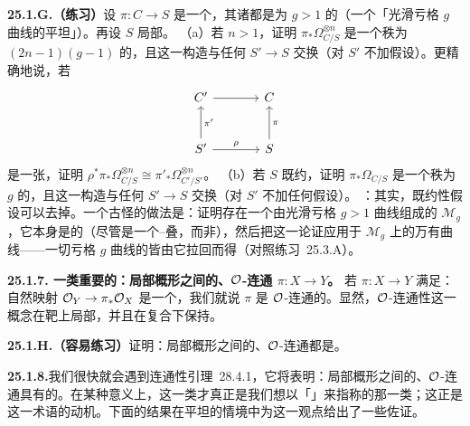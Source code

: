 \textbf{25.1.G.（练习）}\quad 设 $\pi\colon C\to S$ 是一个\trProper\trSmooth\trMorphism，其诸\trFiber{}都是\trGenus{}为 $g>1$ 的\trCurve（一个「光滑亏格 $g$ 曲线的平坦\trFamily」）。再设 $S$ 局部\trNoether。
（a）若 $n>1$，证明 $\pi_*\Omega^{\otimes n}_{C/S}$ 是一个秩为 $(2n-1)(g-1)$ 的\trVectorBundle，且这一构造与任何\trBaseChange{} $S'\to S$ 交换（对 $S'$ 不加\trNoether{}假设）。更精确地说，若
\[
\begin{tikzcd}[row sep=2.6em, column sep=3.6em]
C' \ar[r] & C \\
S' \ar[r, "\rho"] \ar[u, "\pi'"'] & S \ar[u, "\pi"']
\end{tikzcd}
\]
是一张\trCartesianDiagram，证明 $\rho^*\pi_*\Omega^{\otimes n}_{C/S}\cong\pi'_*\Omega^{\otimes n}_{C'/S'}$。
（b）若 $S$ 既约，证明 $\pi_*\Omega_{C/S}$ 是一个秩为 $g$ 的\trVectorBundle，且这一构造与任何\trBaseChange{} $S'\to S$ 交换（对 $S'$ 不加任何假设）。
\trhRemark：其实，既约性假设可以去掉。一个古怪的做法是：证明存在一个由光滑亏格 $g>1$ 曲线组成的\trModuliSpace{} $\mathscr{M}_g$，它本身是\trSmooth{}的（尽管是一个\trDeligne{}--\trMumford{}叠，而非\trScheme），然后把这一论证应用于 $\mathscr{M}_g$ 上的万有曲线——一切亏格 $g$ 曲线的\trFamily{}皆由它拉回而得（对照\mbox{练习~25.3.A}）。

\textbf{25.1.7. 一类重要的\trMorphism：局部\trNoether{}概形之间的\trProper{}、$\mathcal{O}$-连通\trMorphism{} $\pi\colon X\to Y$。}\quad
若\trMorphism{} $\pi\colon X\to Y$ 满足：自然映射 $\mathcal{O}_Y\to\pi_*\mathcal{O}_X$ 是一个\trIsomorphism，我们就说 $\pi$ 是 $\mathcal{O}$-连通的。显然，$\mathcal{O}$-连通性这一概念在靶上局部，并且在复合下保持。

\textbf{25.1.H.（容易练习）}\quad 证明：局部\trNoether{}概形之间的\trProper{}、$\mathcal{O}$-连通\trMorphism{}都是\trSurjectiveMap。

\textbf{25.1.8.}\quad 我们很快就会遇到\mbox{\trZariski{}连通性引理~28.4.1}，它将表明：局部\trNoether{}概形之间的\trProper{}、$\mathcal{O}$-连通\trMorphism{}具有\trConnected{}的\trFiber。在某种意义上，这一类\trMorphism{}才真正是我们想以「\trConnected{}\trFiber」来指称的那一类\trMorphism；这正是这一术语的动机。下面的结果在平坦的情境中为这一观点给出了一些佐证。

